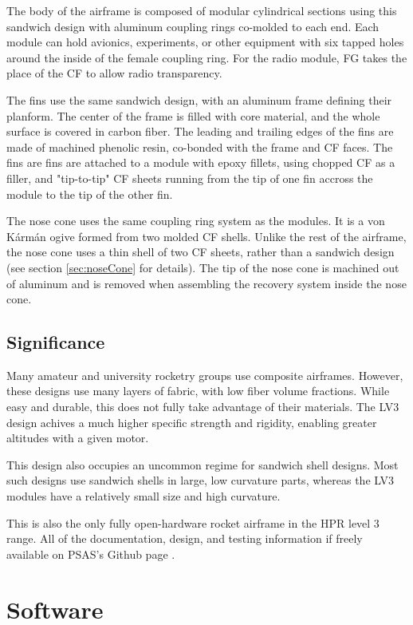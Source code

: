 \documentclass{aiaa-tc}%
\begin{document}
The body of the airframe is composed of modular cylindrical sections using this sandwich design with aluminum coupling rings co-molded to each end.
Each module can hold avionics, experiments, or other equipment with six tapped holes around the inside of the female coupling ring. 
For the radio module, FG takes the place of the CF to allow radio transparency.

The fins use the same sandwich design, with an aluminum frame defining their planform. The center of the frame is filled with core material, and the whole surface is covered in carbon fiber. 
The leading and trailing edges of the fins are made of machined phenolic resin, co-bonded with the frame and CF faces. 
The fins are fins are attached to a module with epoxy fillets, using chopped CF as a filler, and "tip-to-tip" CF sheets running from the tip of one fin accross the module to the tip of the other fin.

The nose cone uses the same coupling ring system as the modules. It is a von K\'arm\'an ogive formed from two molded CF shells. 
Unlike the rest of the airframe, the nose cone uses a thin shell of two CF sheets, rather than a sandwich design (see section \ref{sec:noseCone} for details). 
The tip of the nose cone is machined out of aluminum and is removed when assembling the recovery system inside the nose cone. 

\subsection{Significance}
Many amateur and university rocketry groups use composite airframes. However, these designs use many layers of fabric, with low fiber volume fractions.
While easy and durable, this does not fully take advantage of their materials. The LV3 design achives a much higher specific strength and rigidity, enabling greater altitudes with a given motor. 

This design also occupies an uncommon regime for sandwich shell designs. Most such designs use sandwich shells in large, low curvature parts, whereas the LV3 modules have a relatively small size and high curvature.

This is also the only fully open-hardware rocket airframe in the HPR level 3 range. All of the documentation, design, and testing information if freely available on PSAS's Github page \cite{LV3repo}.

\section{Software}
\end{document}
